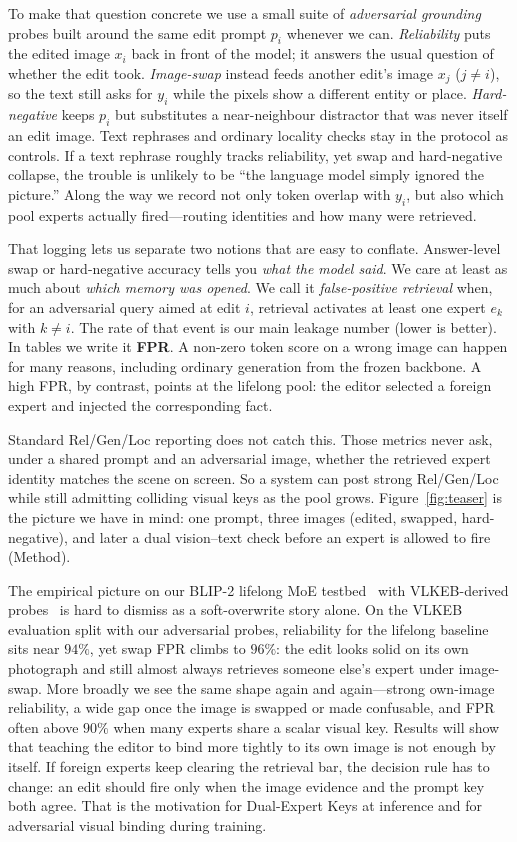 \documentclass[letterpaper]{article} %
\begin{document}
To make that question concrete we use a small suite of \emph{adversarial grounding} probes built around the same edit prompt $p_i$ whenever we can.
\emph{Reliability} puts the edited image $x_i$ back in front of the model; it answers the usual question of whether the edit took.
\emph{Image-swap} instead feeds another edit's image $x_j$ ($j\neq i$), so the text still asks for $y_i$ while the pixels show a different entity or place.
\emph{Hard-negative} keeps $p_i$ but substitutes a near-neighbour distractor that was never itself an edit image.
Text rephrases and ordinary locality checks stay in the protocol as controls.
If a text rephrase roughly tracks reliability, yet swap and hard-negative collapse, the trouble is unlikely to be ``the language model simply ignored the picture.''
Along the way we record not only token overlap with $y_i$, but also which pool experts actually fired---routing identities and how many were retrieved.

That logging lets us separate two notions that are easy to conflate.
Answer-level swap or hard-negative accuracy tells you \emph{what the model said}.
We care at least as much about \emph{which memory was opened}.
We call it \emph{false-positive retrieval} when, for an adversarial query aimed at edit $i$, retrieval activates at least one expert $e_k$ with $k\neq i$.
The rate of that event is our main leakage number (lower is better).
In tables we write it \textbf{FPR}.
A non-zero token score on a wrong image can happen for many reasons, including ordinary generation from the frozen backbone.
A high FPR, by contrast, points at the lifelong pool: the editor selected a foreign expert and injected the corresponding fact.

Standard Rel/Gen/Loc reporting does not catch this.
Those metrics never ask, under a shared prompt and an adversarial image, whether the retrieved expert identity matches the scene on screen.
So a system can post strong Rel/Gen/Loc while still admitting colliding visual keys as the pool grows.
Figure~\ref{fig:teaser} is the picture we have in mind: one prompt, three images (edited, swapped, hard-negative), and later a dual vision--text check before an expert is allowed to fire (Method).

The empirical picture on our BLIP-2 lifelong MoE testbed~\cite{li2023blip2,chen2025liveedit} with VLKEB-derived probes~\cite{huang2024vlkeb} is hard to dismiss as a soft-overwrite story alone.
On the VLKEB evaluation split with our adversarial probes, reliability for the lifelong baseline sits near $94\%$, yet swap FPR climbs to $96\%$: the edit looks solid on its own photograph and still almost always retrieves someone else's expert under image-swap.
More broadly we see the same shape again and again---strong own-image reliability, a wide gap once the image is swapped or made confusable, and FPR often above $90\%$ when many experts share a scalar visual key.
Results will show that teaching the editor to bind more tightly to its own image is not enough by itself.
If foreign experts keep clearing the retrieval bar, the decision rule has to change: an edit should fire only when the image evidence and the prompt key both agree.
That is the motivation for Dual-Expert Keys at inference and for adversarial visual binding during training.
\end{document}
